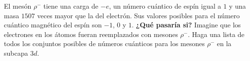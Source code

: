 \item El mesón $\rho^-$ tiene una carga de $-e$, un número cuántico de espín igual a $1$ y una masa $1507$ veces mayor que la del electrón. Sus valores posibles para el número cuántico magnético del espín son $-1$, $0$ y $1$. \textbf{¿Qué pasaría si?} Imagine que los electrones en los átomos fueran reemplazados con mesones $\rho^-$. Haga una lista de todos los conjuntos posibles de números cuánticos para los mesones $\rho^-$ en la subcapa $3d$.